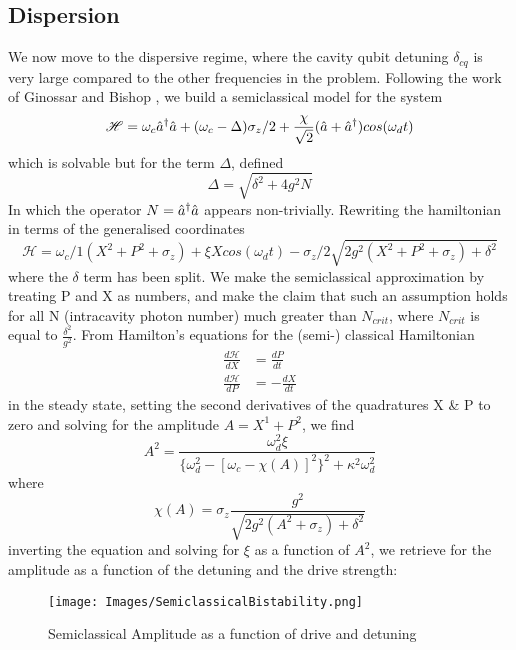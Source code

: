 \subsection{Dispersion}
We now move to the dispersive regime, where the cavity qubit detuning $\delta_{cq}$ is very large compared to the other frequencies in the problem. Following the work of Ginossar and Bishop \cite{Bishop2010}, we build a semiclassical model for the system
\begin{equation}
\mathscr{H} = \omega_c \hat{a}^\dagger \hat{a} + ( \omega_c - \Delta ) \sigma_z /2 + \frac{\chi}{\sqrt{2}} (\hat{a} + \hat{a}^\dagger ) cos(\omega_d t)
\end{equation}
which is solvable but for the term $\Delta$, defined
\begin{equation}
        \Delta = \sqrt{\delta^2 +4 g ^2 N}
\end{equation}
In which the operator $N = \hat{a}^\dagger \hat{a} $ appears non-trivially. Rewriting the hamiltonian in terms of the generalised coordinates
\begin{equation}
        \mathscr{H} = \omega_c/1 (X^2 + P^2 + \sigma_z) + \xi X cos(\omega_d t) - \sigma_z /2 \sqrt{2g^2(X^2+P^2+\sigma_z) + \delta^2}
\end{equation}
where the $\delta$ term has been split. We make the semiclassical approximation by treating P and X as numbers, and make the claim that such an assumption holds for all N (intracavity photon number) much greater than $N_{crit}$, where $N_{crit}$ is equal to $\frac{\delta^2}{g^2}$.
From Hamilton's equations for the (semi-) classical Hamiltonian
\begin{align}
        \frac{d\mathscr{H}}{dX} &= \frac{dP}{dt}\\
        \frac{d\mathscr{H}}{dP} &= -\frac{dX}{dt}
\end{align}
in the steady state, setting the second derivatives of the quadratures X \& P to zero and solving for the amplitude $A = X^1 + P^2$, we find 
\begin{equation}
        A^2 = \frac{\omega_d^2\xi}{\{\omega_d^2 - [\omega_c - \chi (A) ]^2 \}^2+ \kappa^2 \omega_d^2}
\end{equation}
where 
\begin{equation}
        \chi(A) = \sigma_z \frac{g^2}{\sqrt{2g^2(A^2 + \sigma_z) + \delta^2}}
\end{equation}
inverting the equation and solving for $\xi$ as a function of $A^2$, we retrieve for the amplitude as a function of the detuning and the drive strength:
\begin{figure}[h]
        \centering
        \texttt{[image: Images/SemiclassicalBistability.png]}
        \caption{Semiclassical Amplitude as a function of drive and detuning}
\end{figure}
